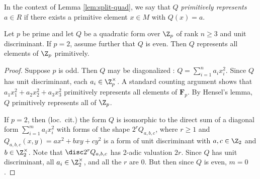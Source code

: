 \documentclass{article}
\def\F{\mathbf{F}}
\begin{document}
In the context of Lemma \ref{lem:split-quad}, we say that $Q$ {\em primitively represents} $a\in R$ if there exists a primitive element $x\in M$ with $Q(x)=a$.  
  

\begin{lm}\label{lem:represent-zp} Let $p$ be prime
  and let $Q$ be a quadratic form over
  $\Z_p$ of rank $n\geq 3$ and
  unit discriminant.  If $p = 2$, assume further that $Q$ is even.
  Then $Q$ represents all elements of $\Z_p$
  primitively.
\end{lm}

\begin{proof}  Suppose $p$ is odd.  Then $Q$ may be diagonalized \cite[p. 369, Theorem 2]{SPLAG}:  $Q=\sum_{i=1}^n a_ix_i^2$. Since $Q$ has unit discriminant, each $a_i\in \Z_p^\times$.  A standard counting argument shows that $a_1x_1^2+a_2x_2^2+a_3x_3^2$ primitively represents all elements of $\F_p$.  By Hensel's lemma, $Q$ primitively represents all of $\Z_p$.

If $p = 2$, then (loc.~cit.) the form $Q$ is isomorphic to the direct
sum of a diagonal form $\sum_{i=1}^m a_ix_i^2$ with forms of the shape
$2^rQ_{a,b,c}$, where $r\geq 1$ and $Q_{a,b,c}(x,y)=ax^2+bxy+cy^2$ is a
form of unit discriminant
with $a,c\in\Z_2$ and $b\in\Z_2^\times$.  Note that $\disc 2^rQ_{a,b,c}$
has 2-adic valuation $2r$.  Since $Q$ has unit discriminant, all
$a_i\in\Z_2^\times$, and all the $r$ are $0$.  But then since $Q$ is even,
$m=0$.


\end{proof}
\end{document}
